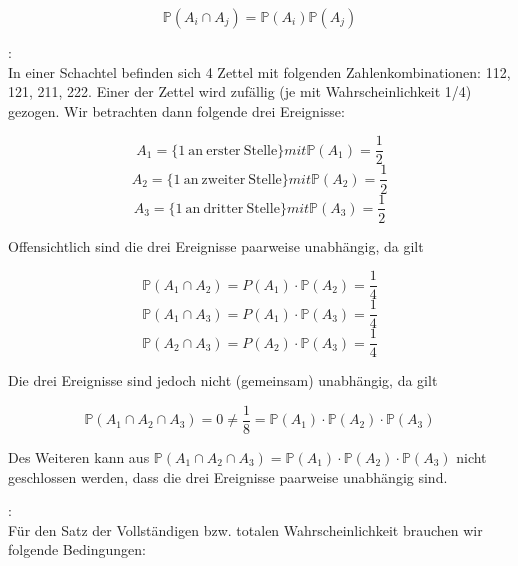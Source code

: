 {\begin{definition}
        \[
            \mathbb P\left(A_{i}\cap A_{j}\right)=
            \mathbb P\left(A_{i}\right)\mathbb P\left(A_{j}\right)
        \]

    \end{definition}

    \begin{bsp}:\\
        In einer Schachtel befinden sich 4 Zettel mit folgenden Zahlenkombinationen: 112, 121, 211, 222. Einer der Zettel wird zufällig (je mit Wahrscheinlichkeit 1/4) gezogen. Wir betrachten dann folgende drei Ereignisse:

            \[A_{1}=\lbrace 1\ {\mathrm {an\ erster\ Stelle}}\rbrace mit \mathbb P(A_{1})={\frac {1}{2}}\]
            \[A_{2}=\lbrace 1\ {\mathrm {an\ zweiter\ Stelle}}\rbrace mit \mathbb P(A_{2})={\frac {1}{2}}\]
            \[A_{3}=\lbrace 1\ {\mathrm {an\ dritter\ Stelle}}\rbrace mit \mathbb P(A_{3})={\frac {1}{2}}\]

        Offensichtlich sind die drei Ereignisse paarweise unabhängig, da gilt

            \[\mathbb P(A_{1}\cap A_{2})=P(A_{1})\cdot \mathbb P(A_{2})={\frac {1}{4}}\]
            \[\mathbb P(A_{1}\cap A_{3})=P(A_{1})\cdot \mathbb P(A_{3})={\frac {1}{4}}\]
            \[\mathbb P(A_{2}\cap A_{3})=P(A_{2})\cdot \mathbb P(A_{3})={\frac {1}{4}}\]

        Die drei Ereignisse sind jedoch nicht (gemeinsam) unabhängig, da gilt

            \[\mathbb P(A_{1}\cap A_{2}\cap A_{3})=0\neq {\frac {1}{8}}=\mathbb P(A_{1})\cdot \mathbb P(A_{2})\cdot \mathbb P(A_{3})\]

        Des Weiteren kann aus $\mathbb P(A_{1}\cap A_{2}\cap A_{3})=\mathbb P(A_{1})\cdot \mathbb P(A_{2})\cdot \mathbb P(A_{3})$ nicht geschlossen werden, dass die drei Ereignisse paarweise unabhängig sind.

    \end{bsp}


    \begin{satz}:\\
    Für den Satz der Vollständigen bzw. totalen Wahrscheinlichkeit brauchen wir folgende Bedingungen:
    \label{satz:vollstaendige_wahrscheinlichkeit}


\end{satz}}
